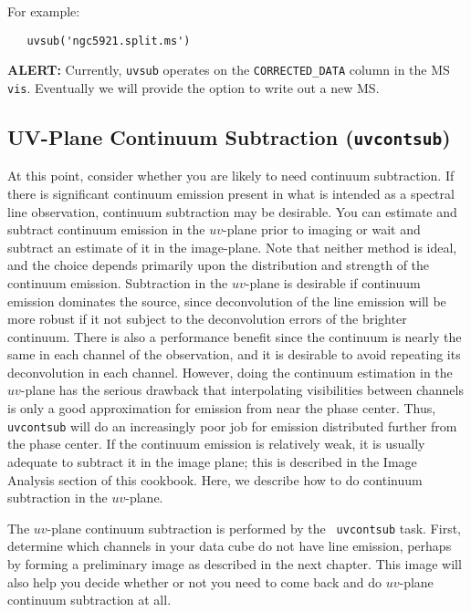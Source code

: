 For example:
\small
\begin{verbatim}
   uvsub('ngc5921.split.ms')
\end{verbatim}
\normalsize

{\bf ALERT:} Currently, {\tt uvsub} operates on the {\tt CORRECTED\_DATA}
column in the MS {\tt vis}.  Eventually we will provide the option to
write out a new MS.

\subsection{UV-Plane Continuum Subtraction ({\tt uvcontsub})}
\label{section:cal.other.uvcontsub}

At this point, consider whether you are likely to need continuum
subtraction.  If there is significant continuum emission present in
what is intended as a spectral line observation, continuum subtraction
may be desirable.  You can estimate and subtract continuum emission in
the $uv$-plane prior to imaging or wait and subtract an estimate of it
in the image-plane.  Note that neither method is ideal, and the choice
depends primarily upon the distribution and strength of the continuum
emission.  Subtraction in the $uv$-plane is desirable if continuum emission dominates
the source, since deconvolution of the line emission will be more robust
if it not subject to the deconvolution errors of the brighter continuum.
There is also a performance benefit since the continuum is nearly the same
in each channel of the observation, and it is desirable to avoid repeating
its deconvolution in each channel.  However, doing the continuum
estimation in the $uv$-plane has the serious drawback that interpolating
visibilities between channels is only a good approximation for emission
from near the phase center.  Thus, {\tt uvcontsub} will do an increasingly
poor job for emission distributed further from the phase center. 
If the continuum emission is relatively weak,
it is usually adequate to subtract it in the image plane; this is
described in the Image Analysis section of this cookbook.  Here, we
describe how to do continuum subtraction in the $uv$-plane.

The $uv$-plane continuum subtraction is performed by the {\tt
  uvcontsub} task.  First, determine which channels in your data cube
do not have line emission, perhaps by forming a preliminary image as
described in the next chapter.  This image will also help you decide
whether or not you need to come back and do $uv$-plane continuum
subtraction at all. 


